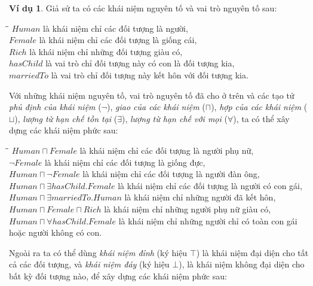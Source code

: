 \documentclass[12pt,a4paper,twoside]{report}
\newcommand{\mand}		{\sqcap}
\newcommand{\mor}		{\sqcup}
\newcommand{\V}			{\forall}
\newcommand{\E}			{\exists}
\newcommand{\Human}			{Human}
\newcommand{\Female}		{Female}
\newcommand{\Male}			{Male}
\newcommand{\Rich}			{Rich}
\newcommand{\hasChild}		{hasChild}
\newcommand{\marriedTo}		{marriedTo}
\theoremstyle{definition}
\newtheorem{Example}{Ví dụ}[chapter]
\begin{document}
\begin{Example}\label{ex:PrimitiveConcept}
Giả sử ta có các khái niệm nguyên tố và vai trò nguyên tố sau:
\begin{tabbing}
  \hspace*{0.5cm}\=\hspace*{2.5cm}\=\kill
  \> $\Human$ \> là khái niệm chỉ các đối tượng là người, \\[0.5ex]
  \> $\Female$ \> là khái niệm chỉ các đối tượng là giống cái,\\[0.5ex]
  \> $\Rich$ \> là khái niệm chỉ những đối tượng giàu có,\\[0.5ex]
  \> $\hasChild$ \> là vai trò chỉ đối tượng này có con là đối tượng kia,\\[0.5ex]
  \> $\marriedTo$ \> là vai trò chỉ đối tượng này kết hôn với đối tượng kia.
\end{tabbing}

Với những khái niệm nguyên tố, vai trò nguyên tố đã cho ở trên và các tạo tử {\em phủ định của khái niệm} ($\neg$), {\em giao của các khái niệm} ($\mand$), {\em hợp của các khái niệm} ($\mor$), {\em lượng từ hạn chế tồn tại} ($\E$), {\em lượng từ hạn chế với mọi} ($\V$), ta có thể xây dựng các khái niệm phức sau:

\begin{tabbing}
  \hspace*{0.5cm}\=\hspace*{5.85cm}\=\kill
  \>$\Human \mand \Female$ \> là khái niệm chỉ các đối tượng là người phụ nữ,\\[0.5ex]
  \> $\neg \Female$       \> là khái niệm chỉ các đối tượng là giống đực,\\[0.5ex]
  \> $\Human \mand \neg \Female$ \> là khái niệm chỉ các đối tượng là người đàn ông,\\[0.5ex]
  \> $\Human \mand \E \hasChild.\Female$ \> là khái niệm chỉ các đối tượng là người có con gái,\\[0.5ex]
  \> $\Human \mand \E \marriedTo.\Human$ \> là khái niệm chỉ những người đã kết hôn,\\[0.5ex]
  \> $\Human \mand \Female \mand \Rich$ \> là khái niệm chỉ những người phụ nữ giàu có,\\[0.5ex]
  \> $\Human \mand \V \hasChild.\Female$ \> là khái niệm chỉ những người chỉ có toàn con gái\\
  \> \> hoặc người không có con.  
\end{tabbing}
Ngoài ra ta có thể dùng {\em khái niệm đỉnh} (ký hiệu $\top$) là khái niệm đại diện cho tất cả các đối tượng, và {\em khái niệm đáy} (ký hiệu $\bot$), là khái niệm không đại diện cho bất kỳ đối tượng nào, để xây dựng các khái niệm phức sau:
\end{Example}
\end{document}
